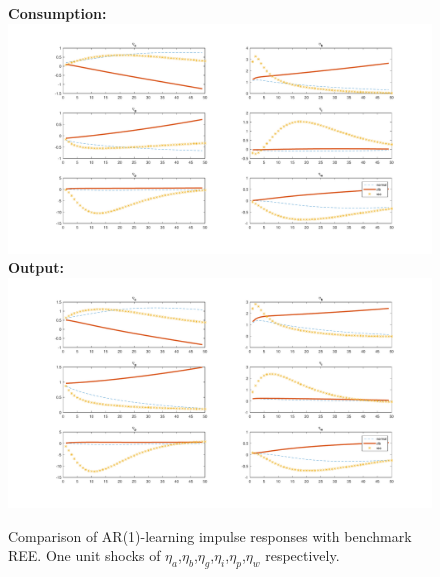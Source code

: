 \documentclass[12pt,reqno]{article}
\numberwithin{equation}{section}
\begin{document}
\begin{figure}[H]
\caption{Comparison of AR(1)-learning impulse responses with benchmark REE. One unit shocks of $\eta_a$,$\eta_b$,$\eta_g$,$\eta_i$,$\eta_p$,$\eta_w$ respectively.}
\textbf{Consumption:}\\
\includegraphics[scale=0.5]{AR1_impresp_cons_reeComp.pdf}
\textbf{Output:}\\
\includegraphics[scale=0.5]{AR1_impresp_output_reeComp.pdf}
\end{figure}
\end{document}
